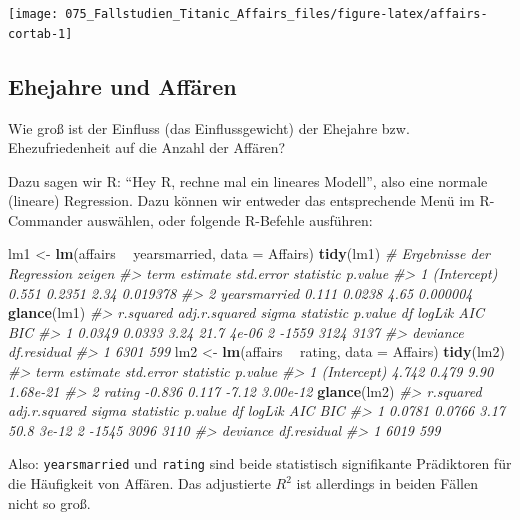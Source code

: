 \documentclass[12pt,ngerman,]{book}
\makeatletter
\newenvironment{Shaded}{\begin{snugshade}}{\end{snugshade}}
\newcommand{\KeywordTok}[1]{\textcolor[rgb]{0.13,0.29,0.53}{\textbf{#1}}}
\newcommand{\DataTypeTok}[1]{\textcolor[rgb]{0.13,0.29,0.53}{#1}}
\newcommand{\StringTok}[1]{\textcolor[rgb]{0.31,0.60,0.02}{#1}}
\newcommand{\CommentTok}[1]{\textcolor[rgb]{0.56,0.35,0.01}{\textit{#1}}}
\newcommand{\OperatorTok}[1]{\textcolor[rgb]{0.81,0.36,0.00}{\textbf{#1}}}
\newcommand{\NormalTok}[1]{#1}
\newenvironment{kframe}{%
\medskip{}
\setlength{\fboxsep}{.8em}
 \def\at@end@of@kframe{}%
 \ifinner\ifhmode%
  \def\at@end@of@kframe{\end{minipage}}%
  \begin{minipage}{\columnwidth}%
 \fi\fi%
 \def\FrameCommand##1{\hskip\@totalleftmargin \hskip-\fboxsep
 \colorbox{shadecolor}{##1}\hskip-\fboxsep
     \hskip-\linewidth \hskip-\@totalleftmargin \hskip\columnwidth}%
 \MakeFramed {\advance\hsize-\width
   \@totalleftmargin\z@ \linewidth\hsize
   \@setminipage}}%
 {\par\unskip\endMakeFramed%
 \at@end@of@kframe}
\renewenvironment{Shaded}{\begin{kframe}}{\end{kframe}}
\theoremstyle{definition}
\theoremstyle{definition}
\theoremstyle{remark}
\makeatother
\begin{document}
\begin{center}\texttt{[image: 075\_Fallstudien\_Titanic\_Affairs\_files/figure-latex/affairs-cortab-1]} \end{center}

\subsection{Ehejahre und Affären}\label{ehejahre-und-affaren}

Wie groß ist der Einfluss (das Einflussgewicht) der Ehejahre bzw.
Ehezufriedenheit auf die Anzahl der Affären?

Dazu sagen wir R: ``Hey R, rechne mal ein lineares Modell'', also eine
normale (lineare) Regression. Dazu können wir entweder das entsprechende
Menü im R-Commander auswählen, oder folgende R-Befehle ausführen:

\begin{Shaded}
\begin{Highlighting}[]
\NormalTok{lm1 <-}\StringTok{ }\KeywordTok{lm}\NormalTok{(affairs }\OperatorTok{~}\StringTok{ }\NormalTok{yearsmarried, }\DataTypeTok{data =}\NormalTok{ Affairs)}
\KeywordTok{tidy}\NormalTok{(lm1)  }\CommentTok{# Ergebnisse der Regression zeigen}
\CommentTok{#>           term estimate std.error statistic  p.value}
\CommentTok{#> 1  (Intercept)    0.551    0.2351      2.34 0.019378}
\CommentTok{#> 2 yearsmarried    0.111    0.0238      4.65 0.000004}
\KeywordTok{glance}\NormalTok{(lm1)}
\CommentTok{#>   r.squared adj.r.squared sigma statistic p.value df logLik  AIC  BIC}
\CommentTok{#> 1    0.0349        0.0333  3.24      21.7   4e-06  2  -1559 3124 3137}
\CommentTok{#>   deviance df.residual}
\CommentTok{#> 1     6301         599}
\NormalTok{lm2 <-}\StringTok{ }\KeywordTok{lm}\NormalTok{(affairs }\OperatorTok{~}\StringTok{ }\NormalTok{rating, }\DataTypeTok{data =}\NormalTok{ Affairs)}
\KeywordTok{tidy}\NormalTok{(lm2)}
\CommentTok{#>          term estimate std.error statistic  p.value}
\CommentTok{#> 1 (Intercept)    4.742     0.479      9.90 1.68e-21}
\CommentTok{#> 2      rating   -0.836     0.117     -7.12 3.00e-12}
\KeywordTok{glance}\NormalTok{(lm2)}
\CommentTok{#>   r.squared adj.r.squared sigma statistic p.value df logLik  AIC  BIC}
\CommentTok{#> 1    0.0781        0.0766  3.17      50.8   3e-12  2  -1545 3096 3110}
\CommentTok{#>   deviance df.residual}
\CommentTok{#> 1     6019         599}
\end{Highlighting}
\end{Shaded}

Also: \texttt{yearsmarried} und \texttt{rating} sind beide statistisch
signifikante Prädiktoren für die Häufigkeit von Affären. Das adjustierte
\(R^2\) ist allerdings in beiden Fällen nicht so groß.
\end{document}
